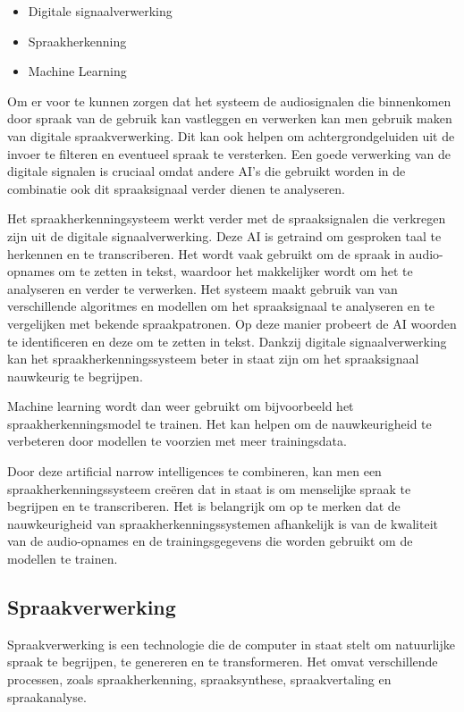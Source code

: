 \begin{itemize}
    \item Digitale signaalverwerking
    \item Spraakherkenning
    \item Machine Learning
\end{itemize}

Om er voor te kunnen zorgen dat het systeem de audiosignalen die binnenkomen door spraak van de gebruik kan vastleggen en verwerken kan men gebruik maken van digitale spraakverwerking. Dit kan ook helpen om achtergrondgeluiden uit de invoer te filteren en eventueel spraak te versterken. Een goede verwerking van de digitale signalen is cruciaal omdat andere AI's die gebruikt worden in de combinatie ook dit spraaksignaal verder dienen te analyseren.

Het spraakherkenningsysteem werkt verder met de spraaksignalen die verkregen zijn uit de digitale signaalverwerking. Deze AI is getraind om gesproken taal te herkennen en te transcriberen. Het wordt vaak gebruikt om de spraak in audio-opnames om te zetten in tekst, waardoor het makkelijker wordt om het te analyseren en verder te verwerken. Het systeem maakt gebruik van van verschillende algoritmes en modellen om het spraaksignaal te analyseren en te vergelijken met bekende spraakpatronen. Op deze manier probeert de AI woorden te identificeren en deze om te zetten in tekst. Dankzij digitale signaalverwerking kan het spraakherkenningssysteem beter in staat zijn om het spraaksignaal nauwkeurig te begrijpen.

Machine learning wordt dan weer gebruikt om bijvoorbeeld het spraakherkenningsmodel te trainen. Het kan helpen om de nauwkeurigheid te verbeteren door modellen te voorzien met meer trainingsdata.

Door deze artificial narrow intelligences te combineren, kan men een spraakherkenningssysteem creëren dat in staat is om menselijke spraak te begrijpen en te transcriberen. Het is belangrijk om op te merken dat de nauwkeurigheid van spraakherkenningssystemen afhankelijk is van de kwaliteit van de audio-opnames en de trainingsgegevens die worden gebruikt om de modellen te trainen.

\subsection{Spraakverwerking}

Spraakverwerking is een technologie die de computer in staat stelt om natuurlijke spraak te begrijpen, te genereren en te transformeren. Het omvat verschillende processen, zoals spraakherkenning, spraaksynthese, spraakvertaling en spraakanalyse.

